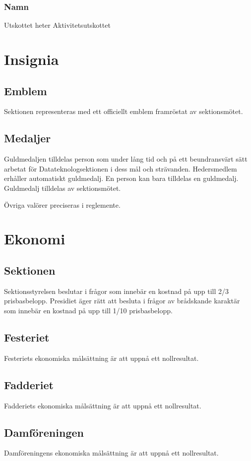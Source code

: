 \documentclass{datateknologsektionen-document}
\begin{document}
      \subsubsection{Namn}
        Utskottet heter Aktivitetsutskottet

  \section{Insignia}
    \subsection{Emblem}
      Sektionen representeras med ett officiellt emblem framröstat av sektionsmötet.
    \subsection{Medaljer}
      \label{medaljer}
      Guldmedaljen tilldelas person som under lång tid och på ett beundransvärt sätt arbetat
      för Datateknologsektionen i dess mål och strävanden. Hedersmedlem erhåller
      automatiskt guldmedalj. En person kan bara tilldelas en guldmedalj. Guldmedalj tilldelas
      av sektionsmötet.
      
      Övriga valörer preciseras i reglemente.

  \section{Ekonomi}
    \subsection{Sektionen}
      \label{ekonomisektionen}
      Sektionsstyrelsen beslutar i frågor som innebär en kostnad på upp till 2/3 prisbasbelopp.
      Presidiet äger rätt att besluta i frågor av brådskande karaktär som innebär en kostnad på
      upp till 1/10 prisbasbelopp.
    \subsection{Festeriet}
      Festeriets ekonomiska målsättning är att uppnå ett nollresultat.
    \subsection{Fadderiet}
      Fadderiets ekonomiska målsättning är att uppnå ett nollresultat.
    \subsection{Damföreningen}
      Damföreningens ekonomiska målsättning är att uppnå ett nollresultat.
\end{document}
